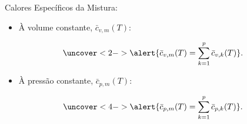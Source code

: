     \begin{frame}{Calores Específicos da Mistura:}\vspace*{-2em}
        \begin{itemize}
            \item<1-> À volume constante, \alert{$\bar{c}_{v,m}(T)$}:
        \end{itemize}
        \vspace*{0.8em}\begin{equation*}
            \uncover<2->{
                \alert{\bar{c}_{v,m}(T) =
                    \sum_{k=1}^p \bar{c}_{v,k}(T)}.
            }
        \end{equation*}
        \begin{itemize}
            \item<3-> À pressão constante, \alert{$\bar{c}_{p,m}(T)$}:
        \end{itemize}
        \vspace*{0.8em}\begin{equation*}
            \uncover<4->{
                \alert{\bar{c}_{p,m}(T) =
                    \sum_{k=1}^p \bar{c}_{p,k}(T)}.
            }
        \end{equation*}
    \end{frame}

